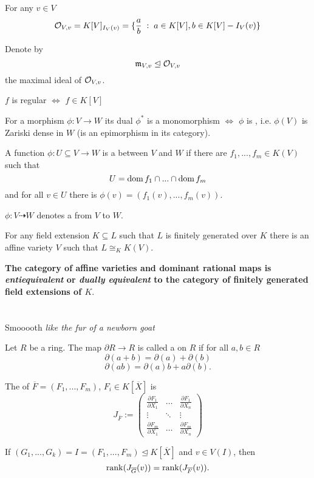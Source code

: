 \documentclass[twoside, a4paper, 12pt]{book}
\begin{document}
\begin{fact}{}{}
  For any $v\in V$
  $$\mathcal{O}_{V,v}=K[V]_{I_V(v)}=\{\frac{a}{b}\;:\;a\in K[V],b\in K[V]-I_V(v)\}$$
\end{fact}

Denote by
$$\mathfrak{m}_{V,v}\trianglelefteq \mathcal{O}_{V,v}$$
the maximal ideal of $\mathcal{O}_{V,v}$.

$f$ is regular $\iff$ $f\in K[V]$

\begin{lemma}{}{}
  For a morphism $\phi:V\to W$ its dual $\phi^*$ is a monomorphism $\iff$ $\phi$ is , i.e. $\phi(V)$ is Zariski dense in $W$ (is an epimorphism in its category).
\end{lemma}

A function $\phi:U\subseteq V\to W$ is a  between $V$ and $W$ if there are $f_1,..., f_m\in K(V)$ such that 
$$U=\operatorname{dom} f_1\cap...\cap \operatorname{dom} f_m$$
and for all $v\in U$ there is $\phi(v)=(f_1(v),..., f_m(v))$.

$\phi:V\dasharrow W$ denotes a  from $V$ to $W$.

For any field extension $K\subseteq L$ such that $L$ is finitely generated over $K$ there is an affine variety $V$ such that $L\cong_K K(V)$.

\textbf{The category of affine varieties and dominant rational maps is \emph{entiequivalent} or \emph{dually equivalent} to the category of finitely generated field extensions of $K$}.

\section{}{Smooooth \emph{like the fur of a newborn goat}}

Let $R$ be a ring. The map $\partial R\to R$ is called a  on $R$ if for all $a,b\in R$ 
$$\partial(a+b)=\partial(a)+\partial(b)$$
$$\partial(ab)=\partial(a)b+a\partial(b).$$

The  of $\overline{F}=(F_1,...,F_m)$, $F_i\in K[\overline{X}]$ is 
$$J_{\overline{F}}:=\begin{pmatrix}\frac{\partial F_1}{\partial X_1} & \dots & \frac{\partial F_1}{\partial X_n}\\\vdots & \ddots & \vdots \\ \frac{\partial F_m}{\partial X_1}&\dots &\frac{\partial F_m}{\partial X_n}\end{pmatrix}$$

\begin{fact}{}{}
  If $(G_1,..., G_k)=I=(F_1,..., F_m)\trianglelefteq K[\overline{X}]$ and $v\in V(I)$, then 
  $$\operatorname{rank}(J_{\overline{G}}(v))=\operatorname{rank}(J_{\overline{F}}(v)).$$
\end{fact}
\end{document}
